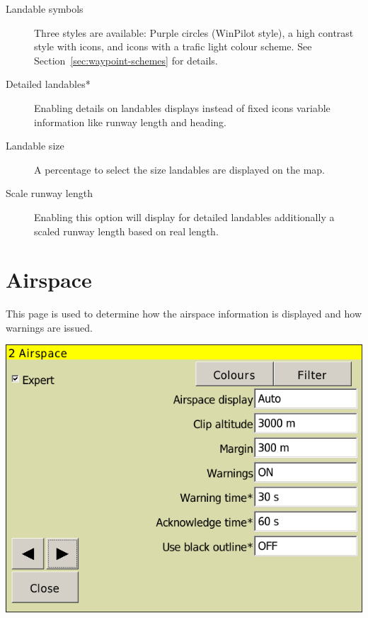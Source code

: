 \begin{description}
\item[Landable symbols]  \label{conf:waypointicons} Three styles are available:
 Purple circles (WinPilot style), a high contrast style with icons,
 and icons with a trafic light colour scheme. See Section~\ref{sec:waypoint-schemes} for details.
\item[Detailed landables*]  Enabling details on landables displays instead of fixed icons 
 variable information like runway length and heading.
\item[Landable size]  A percentage to select the size landables are displayed on the map.
\item[Scale runway length]  Enabling this option will display for detailed landables 
 additionally a scaled runway length based on real length.
\end{description}


\clearpage
\section{Airspace}

This page is used to determine how the airspace information is
displayed and how warnings are issued.

\begin{center}
\includegraphics[angle=0,width=0.8\linewidth,keepaspectratio='true']{figures/config-airspace.png}
\end{center}


